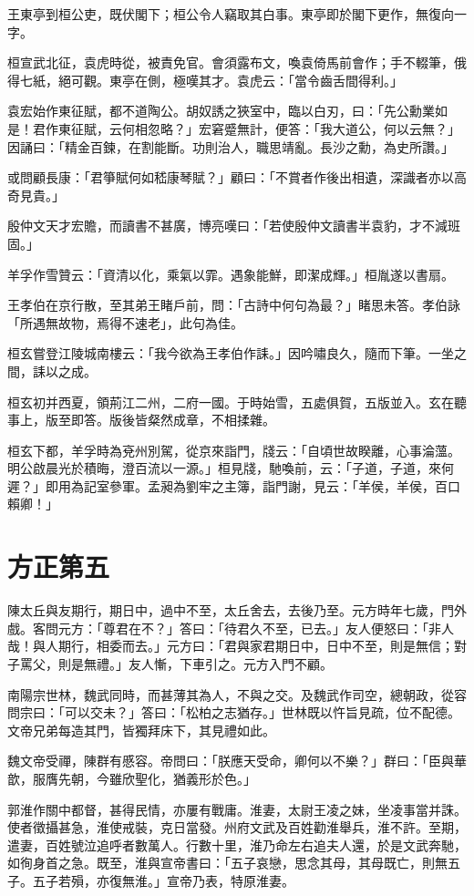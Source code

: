 王東亭到桓公吏，既伏閣下；桓公令人竊取其白事。東亭即於閣下更作，無復向一字。

桓宣武北征，袁虎時從，被責免官。會須露布文，喚袁倚馬前會作；手不輟筆，俄得七紙，絕可觀。東亭在側，極嘆其才。袁虎云：「當令齒舌間得利。」

袁宏始作東征賦，都不道陶公。胡奴誘之狹室中，臨以白刃，曰：「先公勳業如是！君作東征賦，云何相忽略？」宏窘蹙無計，便答：「我大道公，何以云無？」因誦曰：「精金百鍊，在割能斷。功則治人，職思靖亂。長沙之勳，為史所讚。」

或問顧長康：「君箏賦何如嵇康琴賦？」顧曰：「不賞者作後出相遺，深識者亦以高奇見貴。」

殷仲文天才宏贍，而讀書不甚廣，博亮嘆曰：「若使殷仲文讀書半袁豹，才不減班固。」

羊孚作雪贊云：「資清以化，乘氣以霏。遇象能鮮，即潔成輝。」桓胤遂以書扇。

王孝伯在京行散，至其弟王睹戶前，問：「古詩中何句為最？」睹思未答。孝伯詠「所遇無故物，焉得不速老」，此句為佳。

桓玄嘗登江陵城南樓云：「我今欲為王孝伯作誄。」因吟嘯良久，隨而下筆。一坐之間，誄以之成。

桓玄初并西夏，領荊江二州，二府一國。于時始雪，五處俱賀，五版並入。玄在聽事上，版至即答。版後皆粲然成章，不相揉雜。

桓玄下都，羊孚時為兗州別駕，從京來詣門，牋云：「自頃世故睽離，心事淪薀。明公啟晨光於積晦，澄百流以一源。」桓見牋，馳喚前，云：「子道，子道，來何遲？」即用為記室參軍。孟昶為劉牢之主簿，詣門謝，見云：「羊侯，羊侯，百口賴卿！」



\chapter{方正第五}

陳太丘與友期行，期日中，過中不至，太丘舍去，去後乃至。元方時年七歲，門外戲。客問元方：「尊君在不？」答曰：「待君久不至，已去。」友人便怒曰：「非人哉！與人期行，相委而去。」元方曰：「君與家君期日中，日中不至，則是無信；對子罵父，則是無禮。」友人慚，下車引之。元方入門不顧。

南陽宗世林，魏武同時，而甚薄其為人，不與之交。及魏武作司空，總朝政，從容問宗曰：「可以交未？」答曰：「松柏之志猶存。」世林既以忤旨見疏，位不配德。文帝兄弟每造其門，皆獨拜床下，其見禮如此。

魏文帝受禪，陳群有慼容。帝問曰：「朕應天受命，卿何以不樂？」群曰：「臣與華歆，服膺先朝，今雖欣聖化，猶義形於色。」

郭淮作關中都督，甚得民情，亦屢有戰庸。淮妻，太尉王凌之妹，坐凌事當并誅。使者徵攝甚急，淮使戒裝，克日當發。州府文武及百姓勸淮舉兵，淮不許。至期，遣妻，百姓號泣追呼者數萬人。行數十里，淮乃命左右追夫人還，於是文武奔馳，如徇身首之急。既至，淮與宣帝書曰：「五子哀戀，思念其母，其母既亡，則無五子。五子若殞，亦復無淮。」宣帝乃表，特原淮妻。

